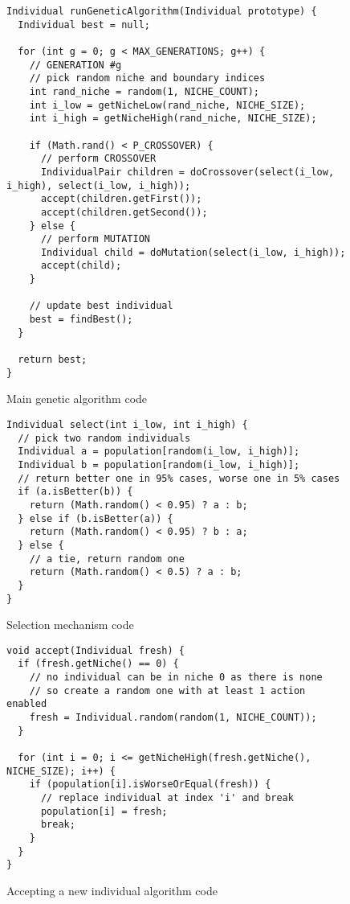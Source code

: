 \begin{figure}
\centering
\begin{lstlisting}
Individual runGeneticAlgorithm(Individual prototype) {
  Individual best = null;

  for (int g = 0; g < MAX_GENERATIONS; g++) {
    // GENERATION #g
    // pick random niche and boundary indices
    int rand_niche = random(1, NICHE_COUNT);
    int i_low = getNicheLow(rand_niche, NICHE_SIZE);
    int i_high = getNicheHigh(rand_niche, NICHE_SIZE);
    
    if (Math.rand() < P_CROSSOVER) {
      // perform CROSSOVER
      IndividualPair children = doCrossover(select(i_low, i_high), select(i_low, i_high));
      accept(children.getFirst());
      accept(children.getSecond());
    } else {
      // perform MUTATION
      Individual child = doMutation(select(i_low, i_high));
      accept(child);
    }
    
    // update best individual
    best = findBest();
  }
  
  return best;
}
\end{lstlisting}
\caption{Main genetic algorithm code}
\label{alg:genetic}
\end{figure}

\begin{figure}
\centering
\begin{lstlisting}
Individual select(int i_low, int i_high) {
  // pick two random individuals
  Individual a = population[random(i_low, i_high)];
  Individual b = population[random(i_low, i_high)];
  // return better one in 95% cases, worse one in 5% cases
  if (a.isBetter(b)) {
    return (Math.random() < 0.95) ? a : b;
  } else if (b.isBetter(a)) {
    return (Math.random() < 0.95) ? b : a;
  } else {
    // a tie, return random one
    return (Math.random() < 0.5) ? a : b;
  }
}
\end{lstlisting}
\caption{Selection mechanism code}
\label{alg:selection}
\end{figure}

\begin{figure}
\centering
\begin{lstlisting}
void accept(Individual fresh) {
  if (fresh.getNiche() == 0) {
    // no individual can be in niche 0 as there is none
    // so create a random one with at least 1 action enabled
    fresh = Individual.random(random(1, NICHE_COUNT));
  } 
  
  for (int i = 0; i <= getNicheHigh(fresh.getNiche(), NICHE_SIZE); i++) {
    if (population[i].isWorseOrEqual(fresh)) {
      // replace individual at index 'i' and break
      population[i] = fresh;
      break;
    }
  }
}
\end{lstlisting}
\caption{Accepting a new individual algorithm code}
\label{alg:accept}
\end{figure}


